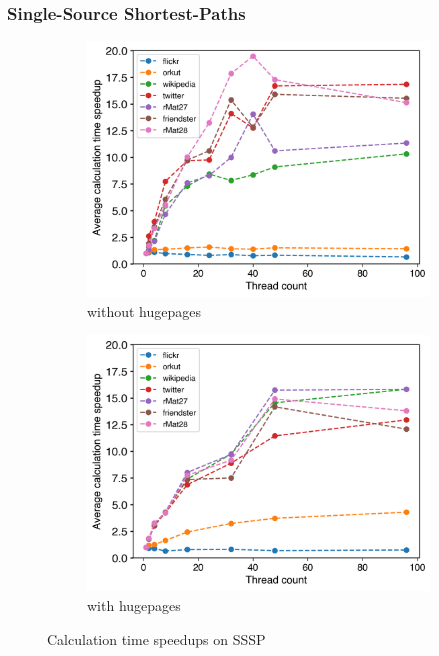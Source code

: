 \subsubsection{Single-Source Shortest-Paths}
\begin{figure}
	\hfil
	\begin{subfigure}{0.4\textwidth}
		\includegraphics[width=\linewidth]{../../plots/singleNodeSSSPGaloisThreads.png}
		\caption{without hugepages}
		\label{fig:galoisSpeedupSSSP_noHP}
	\end{subfigure}
	\begin{subfigure}{0.4\textwidth}
		\includegraphics[width=\linewidth]{../../plots/singleNodeSSSPGaloisHPThreads.png}
		\caption{with hugepages}
		\label{fig:galoisSpeedupSSSP_HP}
	\end{subfigure}
	\hfil
	\caption{Calculation time speedups on SSSP}
	\label{fig:galoisSpeedupSSSP}
\end{figure}
